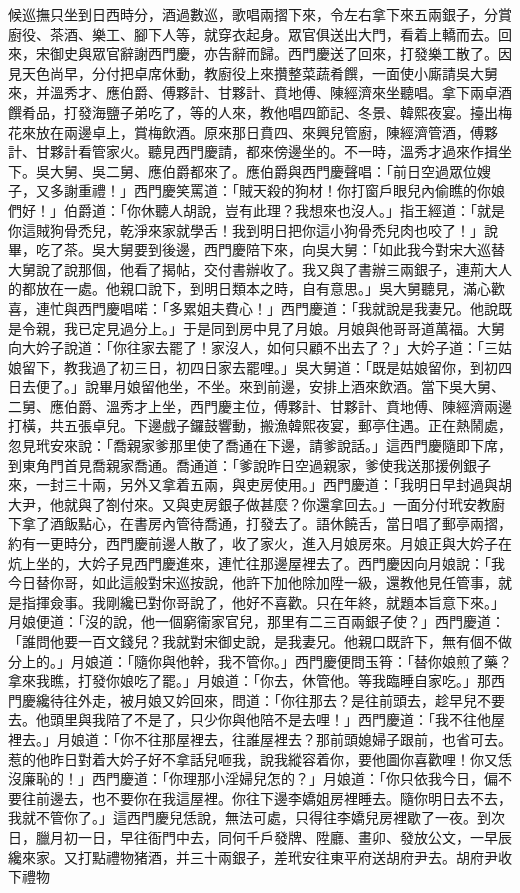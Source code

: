 \begin{showcontents}{}
候巡撫只坐到日西時分，酒過數巡，歌唱兩摺下來，令左右拿下來五兩銀子，分賞廚役、茶酒、樂工、腳下人等，就穿衣起身。眾官俱送出大門，看着上轎而去。回來，宋御史與眾官辭謝西門慶，亦告辭而歸。西門慶送了回來，打發樂工散了。因見天色尚早，分付把卓席休動，教廚役上來攢整菜蔬肴饌，一面使小廝請吳大舅來，并溫秀才、應伯爵、傅夥計、甘夥計、賁地傅、陳經濟來坐聽唱。拿下兩卓酒饌肴品，打發海鹽子弟吃了，等的人來，教他唱四節記、冬景、韓熙夜宴。擡出梅花來放在兩邊卓上，賞梅飲酒。原來那日賁四、來興兒管廚，陳經濟管酒，傅夥計、甘夥計看管家火。聽見西門慶請，都來傍邊坐的。不一時，溫秀才過來作揖坐下。吳大舅、吳二舅、應伯爵都來了。應伯爵與西門慶聲唱：「前日空過眾位嫂子，又多謝重禮！」西門慶笑罵道：「賊天殺的狗材！你打窗戶眼兒內偷瞧的你娘們好！」伯爵道：「你休聽人胡說，豈有此理？我想來也沒人。」指王經道：「就是你這賊狗骨禿兒，乾淨來家就學舌！我到明日把你這小狗骨禿兒肉也咬了！」說畢，吃了茶。吳大舅要到後邊，西門慶陪下來，向吳大舅：「如此我今對宋大巡替大舅說了說那個，他看了揭帖，交付書辦收了。我又與了書辦三兩銀子，連荊大人的都放在一處。他親口說下，到明日類本之時，自有意思。」吳大舅聽見，滿心歡喜，連忙與西門慶唱喏：「多累姐夫費心！」西門慶道：「我就說是我妻兄。他說既是令親，我已定見過分上。」于是同到房中見了月娘。月娘與他哥哥道萬福。大舅向大妗子說道：「你往家去罷了！家沒人，如何只顧不出去了？」大妗子道：「三姑娘留下，教我過了初三日，初四日家去罷哩。」吳大舅道：「既是姑娘留你，到初四日去便了。」說畢月娘留他坐，不坐。來到前邊，安排上酒來飲酒。當下吳大舅、二舅、應伯爵、溫秀才上坐，西門慶主位，傅夥計、甘夥計、賁地傅、陳經濟兩邊打橫，共五張卓兒。下邊戲子鑼鼓響動，搬漁韓熙夜宴，郵亭住遇。正在熱鬧處，忽見玳安來說：「喬親家爹那里使了喬通在下邊，請爹說話。」這西門慶隨即下席，到東角門首見喬親家喬通。喬通道：「爹說昨日空過親家，爹使我送那援例銀子來，一封三十兩，另外又拿着五兩，與吏房使用。」西門慶道：「我明日早封過與胡大尹，他就與了劄付來。又與吏房銀子做甚麼？你還拿回去。」一面分付玳安教廚下拿了酒飯點心，在書房內管待喬通，打發去了。語休饒舌，當日唱了郵亭兩摺，約有一更時分，西門慶前邊人散了，收了家火，進入月娘房來。月娘正與大妗子在炕上坐的，大妗子見西門慶進來，連忙往那邊屋裡去了。西門慶因向月娘說：「我今日替你哥，如此這般對宋巡按說，他許下加他除加陞一級，還教他見任管事，就是指揮僉事。我剛纔已對你哥說了，他好不喜歡。只在年終，就題本旨意下來。」月娘便道：「沒的說，他一個窮衞家官兒，那里有二三百兩銀子使？」西門慶道：「誰問他要一百文錢兒？我就對宋御史說，是我妻兄。他親口既許下，無有個不做分上的。」月娘道：「隨你與他幹，我不管你。」西門慶便問玉筲：「替你娘煎了藥？拿來我瞧，打發你娘吃了罷。」月娘道：「你去，休管他。等我臨睡自家吃。」那西門慶纔待往外走，被月娘又妗回來，問道：「你往那去？是往前頭去，趁早兒不要去。他頭里與我陪了不是了，只少你與他陪不是去哩！」西門慶道：「我不往他屋裡去。」月娘道：「你不往那屋裡去，往誰屋裡去？那前頭媳婦子跟前，也省可去。惹的他昨日對着大妗子好不拿話兒咂我，說我縱容着你，要他圖你喜歡哩！你又恁沒廉恥的！」西門慶道：「你理那小淫婦兒怎的？」月娘道：「你只依我今日，偏不要往前邊去，也不要你在我這屋裡。你往下邊李嬌姐房裡睡去。隨你明日去不去，我就不管你了。」這西門慶兒恁說，無法可處，只得往李嬌兒房裡歇了一夜。到次日，臘月初一日，早往衙門中去，同何千戶發牌、陞廳、畫卯、發放公文，一早辰纔來家。又打點禮物猪酒，并三十兩銀子，差玳安往東平府送胡府尹去。胡府尹收下禮物
\end{showcontents}
